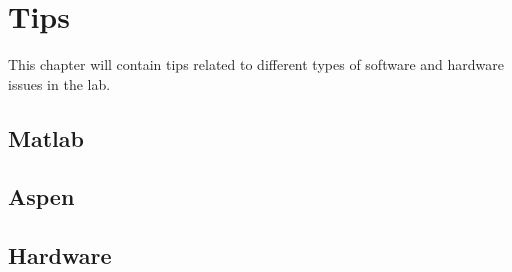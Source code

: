 \chapter{Tips}

This chapter will contain tips related to different types of software and hardware issues in the lab.

\section{Matlab}

\section{Aspen}

\section{Hardware}
